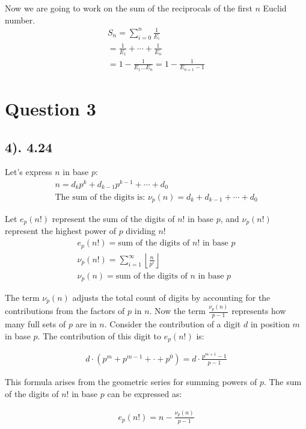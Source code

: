 \documentclass[12pt]{article}
\begin{document}
Now we are going to work on the sum of the reciprocals of the first $n$ Euclid number.
\begin{gather*}
    S_{n} = \sum_{i=0}^n \frac{1}{E_{i}} \\
    = \frac{1}{E_{1}} + \cdots + \frac{1}{E_{n}} \\
    = 1 - \frac{1}{E_{1} \ldots E_{n}} = 1 - \frac{1}{E_{n+1} - 1}
\end{gather*}

\section*{Question 3}
\subsection*{4). 4.24}
Let's express $n$ in base $p$:
\begin{gather*}
    n = d_{k}p^k + d_{k-1}p^{k-1} + \cdots + d_{0} \\
    \text{The sum of the digits is: } \nu_p(n) = d_{k} + d_{k-1} + \cdots + d_{0}
\end{gather*}

Let $e_p(n!)$ represent the sum of the digits of $n!$ in base $p$, and $\nu_p(n!)$ represent the highest power of $p$ dividing $n!$
\begin{gather*}
    e_p(n!) = \text{sum of the digits of } n! \text{ in base } p \\
    \nu_p(n!) = \sum_{i=1}^{\infty} \left\lfloor \frac{n}{p^i} \right\rfloor \\
    \nu_p(n) = \text{sum of the digits of } n \text{ in base } p
\end{gather*}

The term $\nu_p(n)$ adjusts the total count of digits by accounting for the contributions from the
factors of $p$ in $n$. Now the term $\frac{\nu_p(n)}{p-1}$ represents how many full sets of $p$ are in $n$.
Consider the contribution of a digit $d$ in position $m$ in base $p$. The contribution of this digit to $e_p(n!)$ is:

\begin{gather*}
    d \cdot (p^m + p^{m-1} + \cdot + p^0) = d \cdot \frac{p^{m+1} - 1}{p - 1}
\end{gather*}

This formula arises from the geometric series for summing powers of $p$.
The sum of the digits of $n!$ in base $p$ can be expressed as:

\begin{gather*}
    e_p(n!) = n - \frac{\nu_p(n)}{p - 1}
\end{gather*}
\end{document}
